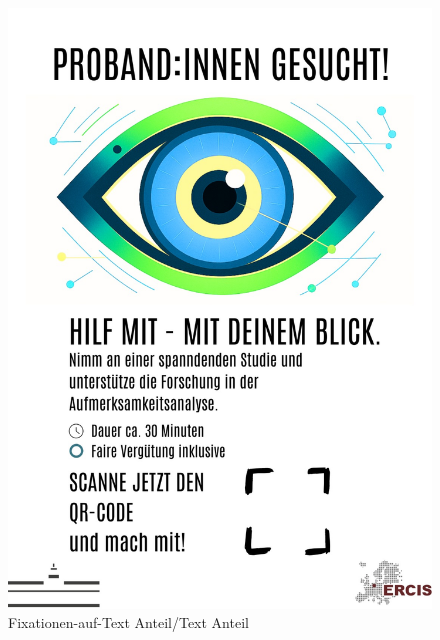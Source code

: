 \documentclass[
    language=german, %
    thesis=seminar, %
    supervisor=postdoc, %
    multiauthor=true, %
    ]{settings/csssa-thesis}
\begin{document}
\begin{figure}[h]
    \centering
    \includegraphics[width=\linewidth,height=0.8\textheight,keepaspectratio]{figures/Dummy.jpg}
    \caption{Fixationen-auf-Text Anteil/Text Anteil}\label{fig:bild26}
\end{figure}
\end{document}

